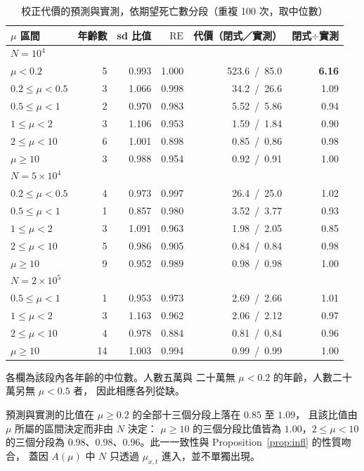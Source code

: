 \documentclass[UTF8, fontset=macnew, a4paper, 12pt]{ctexart}
\begin{document}
\begin{table}[H]
\centering
\caption{校正代價的預測與實測，依期望死亡數分段（重複 100 次，取中位數）}
\small
\begin{tabular}{lrrrrr}
\toprule
$\mu$ 區間 & 年齡數 & sd 比值 & $\mathrm{RE}$ & 代價（閉式／實測） & 閉式$\div$實測\\
\midrule
\multicolumn{6}{l}{\textit{$N=10^{4}$}}\\
$\mu<0.2$     & 5 & 0.993 & 1.000 & 523.6\ /\ 85.0 & \textbf{6.16}\\
$0.2\le\mu<0.5$ & 3 & 1.066 & 0.998 & 34.2\ /\ 26.6 & 1.09\\
$0.5\le\mu<1$ & 2 & 0.970 & 0.983 & 5.52\ /\ 5.86 & 0.94\\
$1\le\mu<2$   & 3 & 1.106 & 0.953 & 1.59\ /\ 1.84 & 0.90\\
$2\le\mu<10$  & 6 & 1.001 & 0.898 & 0.85\ /\ 0.86 & 0.98\\
$\mu\ge10$    & 3 & 0.988 & 0.954 & 0.92\ /\ 0.91 & 1.00\\
\midrule
\multicolumn{6}{l}{\textit{$N=5\times10^{4}$}}\\
$0.2\le\mu<0.5$ & 4 & 0.973 & 0.997 & 26.4\ /\ 25.0 & 1.02\\
$0.5\le\mu<1$ & 1 & 0.857 & 0.980 & 3.52\ /\ 3.77 & 0.93\\
$1\le\mu<2$   & 3 & 1.091 & 0.963 & 1.98\ /\ 2.05 & 0.85\\
$2\le\mu<10$  & 5 & 0.986 & 0.905 & 0.84\ /\ 0.84 & 0.98\\
$\mu\ge10$    & 9 & 0.952 & 0.989 & 0.98\ /\ 0.98 & 1.00\\
\midrule
\multicolumn{6}{l}{\textit{$N=2\times10^{5}$}}\\
$0.5\le\mu<1$ & 1 & 0.953 & 0.973 & 2.69\ /\ 2.66 & 1.01\\
$1\le\mu<2$   & 3 & 1.163 & 0.962 & 2.06\ /\ 2.12 & 0.97\\
$2\le\mu<10$  & 4 & 0.978 & 0.884 & 0.81\ /\ 0.84 & 0.96\\
$\mu\ge10$    & 14 & 1.003 & 0.994 & 0.99\ /\ 0.99 & 1.00\\
\bottomrule
\end{tabular}

\vspace{3pt}
{\footnotesize 各欄為該段內各年齡的中位數。人數五萬與
二十萬無 $\mu<0.2$ 的年齡，人數二十萬另無 $\mu<0.5$ 者，
因此相應各列從缺。}
\label{tab:v3}
\end{table}

預測與實測的比值在 $\mu\ge0.2$ 的全部十三個分段上落在 $0.85$ 至 $1.09$，
且該比值由 $\mu$ 所屬的區間決定而非由 $N$ 決定：
$\mu\ge10$ 的三個分段比值皆為 $1.00$，$2\le\mu<10$ 的三個分段為
$0.98$、$0.98$、$0.96$。此一一致性與 Proposition~\ref{prop:infl} 的性質吻合，
蓋因 $A(\mu)$ 中 $N$ 只透過 $\mu_{x,t}$ 進入，並不單獨出現。
\end{document}
